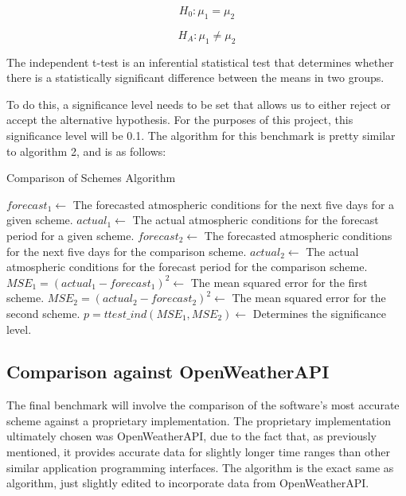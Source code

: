 \begin{equation}
    H_0 : \mu_1 = \mu_2 
\end{equation}

\begin{equation}
    H_A : \mu_1 \neq \mu_2 
\end{equation}

\begin{definition}
The independent t-test is an inferential statistical test that determines whether there is a statistically significant difference between the means in two groups.
\end{definition}

To do this, a significance level needs to be set that allows us to either reject or accept the alternative hypothesis. For the purposes of this project, this significance level will be 0.1. The algorithm for this benchmark is pretty similar to algorithm 2, and is as follows:

\begin{algorithm}[H]
    \caption{Comparison of Schemes Algorithm}
    \begin{algorithmic}[1]
        \State $ forecast_{1} \gets $ The forecasted atmospheric conditions for the next five days for a given scheme. 
        \State $ actual_{1} \gets $ The actual atmospheric conditions for the forecast period for a given scheme.
        \State $ forecast_{2} \gets $ The forecasted atmospheric conditions for the next five days for the comparison scheme. 
        \State $ actual_{2} \gets $ The actual atmospheric conditions for the forecast period for the comparison scheme.
        \State $MSE_{1} = (actual_{1} - forecast_{1})^2 \gets$ The mean squared error for the first scheme.
        \State $MSE_{2} = (actual_{2} - forecast_{2})^2 \gets$ The mean squared error for the second scheme.
        \State $p = ttest\_ind(MSE_{1}, MSE_{2}) \gets $ Determines the significance level.
    \end{algorithmic}
\end{algorithm}

\subsection{Comparison against OpenWeatherAPI}
The final benchmark will involve the comparison of the software's most accurate scheme against a proprietary implementation. The proprietary implementation ultimately chosen was OpenWeatherAPI, due to the fact that, as previously mentioned, it provides accurate data for slightly longer time ranges than other similar application programming interfaces\cite{owa}. The algorithm is the exact same as algorithm, just slightly edited to incorporate data from OpenWeatherAPI.  

